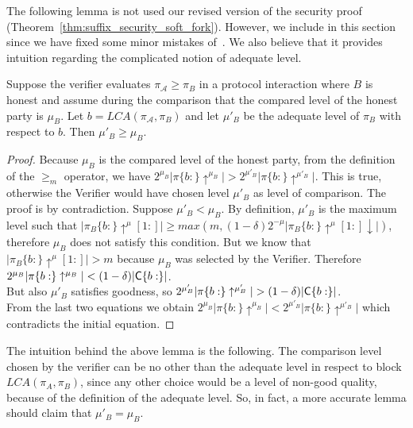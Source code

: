 The following lemma is not used our revised version of the security proof (Theorem~\ref{thm:suffix_security_soft_fork}). However, we include in this section since we have fixed some minor mistakes of~\cite{nipopows}. We also believe that it provides intuition regarding the complicated notion of adequate level.
\begin{lemma}
	Suppose the verifier evaluates $\pi_\mathcal{A} \geq \pi_B$ in a
	protocol interaction where $B$ is honest and assume during the comparison that the
	compared level of the honest party is $\mu_B$. Let $b = LCA(\pi_\mathcal{A}, \pi_B)$ and
	let ${\mu}'_B$ be the adequate level of $\pi_B$ with respect to $b$. Then ${\mu}'_B
	\geq \mu_B$.
	\label{lemm:greatest_adequate}
\end{lemma}
\begin{proof}
	Because $\mu_B$ is the compared level of the honest party, from
	the definition of the $\geq_m$ operator, we have $2^{\mu_B} \vert \pi\{b:\}\uparrow^{\mu_B}
	\vert > 2^{{\mu}'_B} \vert \pi\{b:\}\uparrow^{{\mu}'_B} \vert $. This is true,
	otherwise the Verifier would have chosen level $\mu'_B$ as level of comparison.
	The proof is by contradiction. Suppose $\mu'_B < \mu_B$.
	By definition, $\mu'_B$ is the maximum level such that $\vert \pi_B\{b:\}\uparrow^\mu
	[1:] \vert \geq max(m, (1-\delta)2^{-\mu}\vert \pi_B\{b:\}\uparrow^\mu [1:]\downarrow
	\vert)$, therefore $\mu_B$ does not satisfy this condition.
	But we know that $\vert \pi_B\{b:\}\uparrow^\mu [1:] \vert > m$ because
	$\mu_B$ was selected by the Verifier.
	Therefore $ 2^{\mu_B} \vert \pi\{b:\}\uparrow^{\mu_B} \vert < (1-\delta)\vert
	\mathsf{C}\{b:\}\vert $. \\
	But also $\mu'_B$ satisfies goodness, so $ 2^{\mu'_B} \vert \pi\{b:\}\uparrow^{\mu'_B}
	\vert > (1-\delta)\vert \mathsf{C}\{b:\}\vert $.\\ From the last two equations we obtain
	$ 2^{\mu_B} \vert \pi\{b:\}\uparrow^{\mu_B} \vert < 2^{\mu'_B} \vert
	\pi\{b:\}\uparrow^{\mu'_B} \vert$ which contradicts the initial equation.
\end{proof}

The intuition behind the above lemma is the following. The comparison level chosen by the verifier can be
no other than the adequate level in respect to block $LCA(\pi_A, \pi_B)$, since
any other choice would be a level of non-good quality, because of the definition of
the adequate level. 
So, in fact, a more accurate lemma should claim that $\mu'_B = \mu_B$. 

